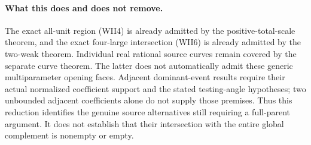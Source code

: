 \paragraph{What this does and does not remove.}
The exact all-unit region (WII4) is already admitted by the
positive-total-scale theorem, and the exact four-large intersection
(WII6) is already admitted by the two-weak theorem. Individual real
rational source curves remain covered by the separate curve theorem.
The latter does not automatically admit these generic multiparameter
opening faces. Adjacent dominant-event results require their actual
normalized coefficient support and the stated testing-angle hypotheses;
two unbounded adjacent coefficients alone do not supply those premises.
Thus this reduction identifies the genuine source alternatives still
requiring a full-parent argument. It does not establish that their
intersection with the entire global complement is nonempty or empty.
